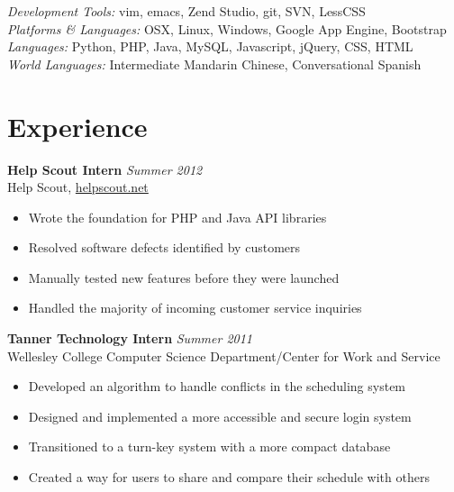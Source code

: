 \documentclass[margin,line]{resume}
\begin{document}
\begin{resume}
    \textsl{Development Tools:} vim, emacs, Zend Studio, git, SVN, LessCSS\vspace{1mm}\\%
	\textsl{Platforms \& Languages:} OSX, Linux, Windows, Google App Engine, Bootstrap\vspace{1mm}\\%
	\textsl{Languages:} Python, PHP, Java, MySQL, Javascript, jQuery, CSS, HTML\vspace{1mm}\\%
	\textsl{World Languages:} Intermediate Mandarin Chinese, Conversational Spanish\vspace{-2mm}\\%
    \section{\mysidestyle Experience}

    \textbf{Help Scout Intern} \hfill \textsl{Summer 2012}\vspace{1mm}\\%
	Help Scout, \href{https://helpscout.net}{helpscout.net}\vspace{0mm}\\\vspace{-2mm}%
	\begin{itemize}
	\item Wrote the foundation for PHP and Java API libraries
	\item Resolved software defects identified by customers
	\item Manually tested new features before they were launched
	\item Handled the majority of incoming customer service inquiries\vspace{1mm}\\%
	\end{itemize}
	
	\textbf{Tanner Technology Intern} \hfill \textsl{Summer 2011}\vspace{1mm}\\%
	Wellesley College Computer Science Department/Center for Work and Service\vspace{0mm}\\\vspace{-2mm}%
	\begin{itemize}
	\item Developed an algorithm to handle conflicts in the scheduling system
	\item Designed and implemented a more accessible and secure login system
	\item Transitioned to a turn-key system with a more compact database
	\item Created a way for users to share and compare their schedule with others\vspace{1mm}\\%
	\end{itemize}
	

\end{resume}
\end{document}
